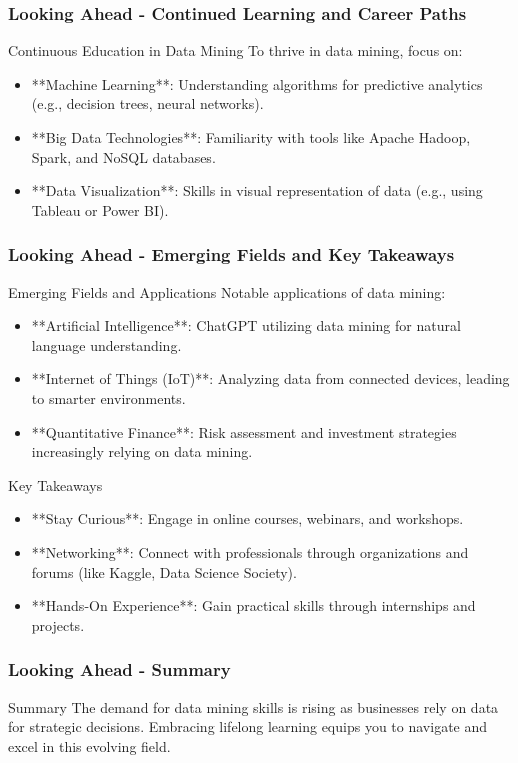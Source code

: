 \documentclass[aspectratio=169]{beamer}
\begin{document}
\begin{frame}[fragile]
    \frametitle{Looking Ahead - Continued Learning and Career Paths}
    \begin{block}{Continuous Education in Data Mining}
        To thrive in data mining, focus on:
        \begin{itemize}
            \item **Machine Learning**: Understanding algorithms for predictive analytics (e.g., decision trees, neural networks).
            \item **Big Data Technologies**: Familiarity with tools like Apache Hadoop, Spark, and NoSQL databases.
            \item **Data Visualization**: Skills in visual representation of data (e.g., using Tableau or Power BI).
        \end{itemize}
    \end{block}
\end{frame}

\begin{frame}[fragile]
    \frametitle{Looking Ahead - Emerging Fields and Key Takeaways}
    \begin{block}{Emerging Fields and Applications}
        Notable applications of data mining:
        \begin{itemize}
            \item **Artificial Intelligence**: ChatGPT utilizing data mining for natural language understanding.
            \item **Internet of Things (IoT)**: Analyzing data from connected devices, leading to smarter environments.
            \item **Quantitative Finance**: Risk assessment and investment strategies increasingly relying on data mining.
        \end{itemize}
    \end{block}

    \begin{block}{Key Takeaways}
        \begin{itemize}
            \item **Stay Curious**: Engage in online courses, webinars, and workshops.
            \item **Networking**: Connect with professionals through organizations and forums (like Kaggle, Data Science Society).
            \item **Hands-On Experience**: Gain practical skills through internships and projects.
        \end{itemize}
    \end{block}
\end{frame}

\begin{frame}[fragile]
    \frametitle{Looking Ahead - Summary}
    \begin{block}{Summary}
        The demand for data mining skills is rising as businesses rely on data for strategic decisions. Embracing lifelong learning equips you to navigate and excel in this evolving field.
    \end{block}
\end{frame}
\end{document}
